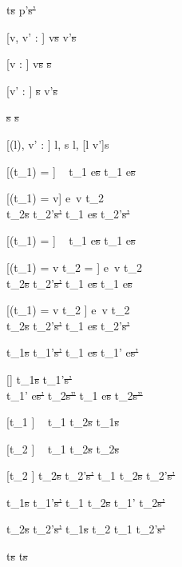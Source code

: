 

  {t\st{s} \handle{\eta} p'\st{s'}}


[v, v' : \beta]
  { }
  {\Edit v\st{s}  \Edit v'\st{s}}


[v : \beta]
  { }
  {\Edit v\st{s} \handle{\Clear} \Fill \beta\st{s}}


[v' : \beta]
  { }
  {\Fill \beta\st{s}  \Edit v'\st{s}}


  { }
  {\Fail\st{s} \handle{\eta} \Fail\st{s}}




[\Sigma(l), v' : \tau]
  { }
{\Change l, s  \Change l, [l \mapsto v']s}

[\Value(t_1) = \nothing]
  {\ }
  {t_1 \ExThen e\st{s} \handle{\Next} t_1 \ExThen e\st{s}}

[\Value(t_1) = v]
  {e\ v \evaluate t_2    \\
   t_2\st{s} \normalise t_2'\st{s'} }
  {t_1 \ExThen e\st{s} \handle{\Next} t_2'\st{s'}}

[\Value(t_1) = \nothing]
  {\ }
  {t_1 \Then e\st{s} \handle{\Execute \pi} t_1 \Then e\st{s}}

[\Value(t_1) = v \land t_2 = \Fail]
  {e\ v \evaluate t_2    \\
   t_2\st{s} \handle{\Pick \pi} t_2'\st{s'} }
  {t_1 \Then e\st{s} \handle{\Execute \pi} t_1 \Then e\st{s}}

[\Value(t_1) = v \land t_2 \neq \Fail]
  {e\ v \evaluate t_2    \\
   t_2\st{s} \handle{\Pick \pi} t_2'\st{s'} }
  {t_1 \Then e\st{s} \handle{\Execute \pi} t_2'\st{s'}}

  {t_1\st{s} \handle{\eta} t_1'\st{s'}}
  {t_1 \ExThen e\st{s} \handle{\eta} t_1' \ExThen e\st{s'}}

[\eta \neq \Execute \pi]
  {t_1\st{s} \handle{\eta} t_1'\st{s'}       \\
   t_1' \Then e\st{s'} \normalise t_2\st{s''} }
  {t_1 \Then e\st{s} \handle{\eta} t_2\st{s''}}

[t_1 \neq \Fail]
  {\ }
  {t_1 \ExOr t_2\st{s} \handle{\Pick \First} t_1\st{s}}

[t_2 \neq \Fail]
  {\ }
  {t_1 \ExOr t_2\st{s} \handle{\Pick \Second} t_2\st{s}}

[t_2 \neq \Fail]
  {t_2\st{s} \handle{\Pick \pi} t_2'\st{s'}}
  {t_1 \ExOr t_2\st{s} \handle{\Pick \Other \pi} t_2'\st{s'}}

  {t_1\st{s} \handle{\eta} t_1'\st{s'} }
  {t_1 \AndOr t_2\st{s} \handle{\Left \eta} t_1' \AndOr t_2\st{s'}}

  {t_2\st{s} \handle{\eta} t_2'\st{s'} }
  {t_1\st{s} \AndOr t_2 \handle{\Right \eta} t_1 \AndOr t_2'\st{s'}}

  { }
  {t\st{s} \handle{\eta} t\st{s}}
